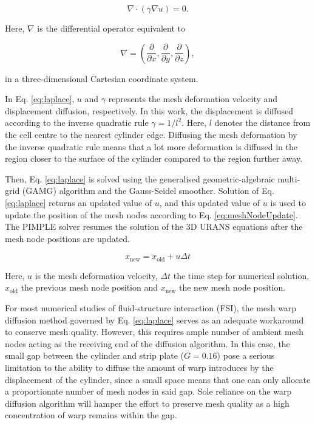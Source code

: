 \documentclass[oneside]{utmthesis}
\begin{document}
\begin{equation}
  \nabla \cdot \left( \gamma \nabla u \right) = 0.
  \label{eq:laplace}
\end{equation}

\noindent Here, $\nabla$ is the differential operator equivalent to

\begin{equation}
  \nabla = \left( \frac{\partial}{\partial x}, \frac{\partial}{\partial y}, \frac{\partial}{\partial z} \right),
  \label{eq:nabla}
\end{equation}

\noindent in a three-dimensional Cartesian coordinate system.

In Eq. \ref{eq:laplace}, $u$ and $\gamma$ represents the mesh deformation velocity and displacement diffusion, respectively. In this work, the displacement is diffused according to the inverse quadratic rule $\gamma = 1/l^{2}$. Here, $l$ denotes the distance from the cell centre to the nearest cylinder edge. Diffusing the mesh deformation by the inverse quadratic rule means that a lot more deformation is diffused in the region closer to the surface of the cylinder compared to the region further away.

Then, Eq. \ref{eq:laplace} is solved using the generalised geometric-algebraic multi-grid (GAMG) algorithm and the Gauss-Seidel smoother. Solution of Eq. \ref{eq:laplace} returns an updated value of $u$, and this updated value of $u$ is used to update the position of the mesh nodes according to Eq. \ref{eq:meshNodeUpdate}. The PIMPLE solver resumes the solution of the 3D URANS equations after the mesh node positions are updated.

\begin{equation}
  x_{\text{new}} = x_{\text{old}} + u \Delta t
  \label{eq:meshNodeUpdate}
\end{equation}

\noindent Here, $u$ is the mesh deformation velocity, $\Delta t$ the time step for numerical solution, $x_{\text{old}}$ the previous mesh node position and $x_{\text{new}}$ the new mesh node position.

For most numerical studies of fluid-structure interaction (FSI), the mesh warp diffusion method governed by Eq. \ref{eq:laplace} serves as an adequate workaround to conserve mesh quality. However, this requires ample number of ambient mesh nodes acting as the receiving end of the diffusion algorithm. In this case, the small gap between the cylinder and strip plate ($G = 0.16$) pose a serious limitation to the ability to diffuse the amount of warp introduces by the displacement of the cylinder, since a small space means that one can only allocate a proportionate number of mesh nodes in said gap. Sole reliance on the warp diffusion algorithm will hamper the effort to preserve mesh quality as a high concentration of warp remains within the gap.
\end{document}
